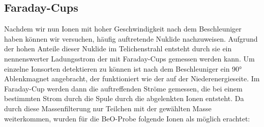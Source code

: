 \subsection{Faraday-Cups}
Nachdem wir nun Ionen mit hoher Geschwindigkeit nach dem Beschleuniger haben können wir versuchen, häufig auftretende Nuklide nachzuweisen.
Aufgrund der hohen Anteile dieser Nuklide im Telichenstrahl entsteht durch sie ein nennenswerter Ladungsstrom der mit Faraday-Cups gemessen werden kann.
Um einzelne Ionsorten detektieren zu können ist nach dem Beschleuniger ein \ang{90} Ablenkmagnet angebracht, der funktioniert wie der auf der Niederenergieseite.
Im Faraday-Cup werden dann die auftreffenden Ströme gemessen, die bei einem bestimmten Strom durch die Spule durch die abgelenkten Ionen entsteht.
Da durch diese Massenfilterung nur Teilchen mit der gewählten Masse weiterkommen, wurden für die BeO-Probe folgende Ionen als möglich erachtet:
